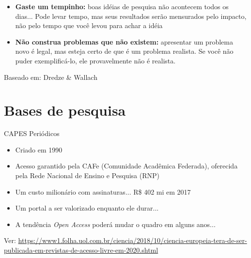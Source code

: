 \begin{frame}
\begin{itemize}
\item \textbf{Gaste um tempinho:} boas idéias de pesquisa não acontecem todos os dias... Pode levar tempo, mas seus resultados serão mensurados pelo impacto, não pelo tempo que você levou para achar a idéia
\item \textbf{Não construa problemas que não existem:} apresentar um problema novo é legal, mas esteja certo de que é um problema realista. Se você não puder exemplificá-lo, ele provavelmente não é realista. 
\end{itemize}
Baseado em: Dredze \& Wallach
\end{frame}

\section{Bases de pesquisa}

\begin{frame}{CAPES Periódicos}
\begin{itemize}
\item Criado em 1990 
\item Acesso garantido pela CAFe (Comunidade Acadêmica Federada), oferecida pela Rede Nacional de Ensino e Pesquisa (RNP)
\item Um custo milionário com assinaturas... R\$ 402 mi em 2017
\item Um portal a ser valorizado enquanto ele durar...
\item A tendência \emph{Open Access} poderá mudar o quadro em alguns anos...
\end{itemize}

Ver: \scriptsize{\url{https://www1.folha.uol.com.br/ciencia/2018/10/ciencia-europeia-tera-de-ser-publicada-em-revistas-de-acesso-livre-em-2020.shtml}}
\end{frame}

